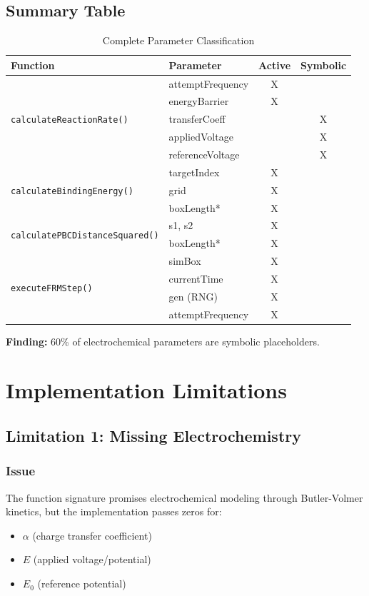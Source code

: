 \documentclass[11pt,a4paper]{article}
\begin{document}
\subsection{Summary Table}

\begin{table}[H]
\centering
\caption{Complete Parameter Classification}
\begin{tabular}{|l|l|c|c|}
\hline
\textbf{Function} & \textbf{Parameter} & \textbf{Active} & \textbf{Symbolic} \\
\hline
\multirow{5}{*}{\texttt{calculateReactionRate()}} 
  & attemptFrequency & X & \\
  & energyBarrier & X & \\
  & transferCoeff & & X \\
  & appliedVoltage & & X \\
  & referenceVoltage & & X \\
\hline
\multirow{3}{*}{\texttt{calculateBindingEnergy()}}
  & targetIndex & X & \\
  & grid & X & \\
  & boxLength* & X & \\
\hline
\multirow{2}{*}{\texttt{calculatePBCDistanceSquared()}}
  & s1, s2 & X & \\
  & boxLength* & X & \\
\hline
\multirow{4}{*}{\texttt{executeFRMStep()}}
  & simBox & X & \\
  & currentTime & X & \\
  & gen (RNG) & X & \\
  & attemptFrequency & X & \\
\hline
\end{tabular}
\end{table}

\textbf{Finding:} 60\% of electrochemical parameters are symbolic placeholders.

\newpage

\section{Implementation Limitations}

\subsection{Limitation 1: Missing Electrochemistry}

\subsubsection{Issue}
The function signature promises electrochemical modeling through Butler-Volmer kinetics, but the implementation passes zeros for:
\begin{itemize}
    \item $\alpha$ (charge transfer coefficient)
    \item $E$ (applied voltage/potential)
    \item $E_0$ (reference potential)
\end{itemize}
\end{document}
